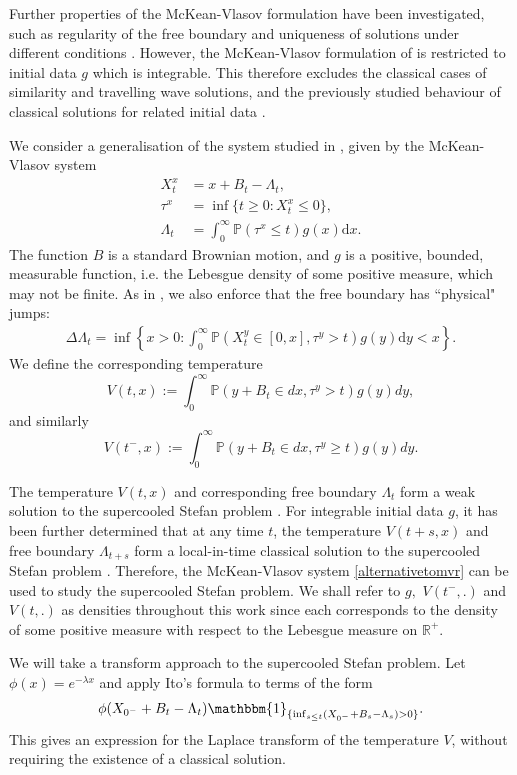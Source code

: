 \documentclass[11pt]{article}
\theoremstyle{plain}
\theoremstyle{remark}
\theoremstyle{definition}
\numberwithin{equation}{section}
\begin{document}
Further properties of the McKean-Vlasov formulation have been investigated, such as regularity of the free boundary \cite{2,3} and uniqueness of solutions under different conditions \cite{5, mustapha2023wellposednesssupercooledstefanproblem, 3, munoz2026freeboundaryregularitywellposedness}. However, the McKean-Vlasov formulation of \cite{3}  is restricted to initial data $g$ which is integrable. This therefore excludes the classical cases of similarity and travelling wave solutions, and the previously studied behaviour of classical solutions for related initial data \cite{Ricci_Weiqing_1991,4}.


We consider a generalisation of the system studied in \cite{3}, given by the McKean-Vlasov system
\begin{align}
    X^x_t &=x+B_t-\Lambda_t,\nonumber\\
    \tau^x &=\inf\{t\geq 0:X^x_t\leq 0\},\label{alternativetomvr}\\
    \Lambda_t &=\int_0^\infty \mathbb{P}(\tau^x\leq t)g(x)\textrm{d}x.\nonumber
\end{align}
The function $B$ is a standard Brownian motion, and $g$ is a positive, bounded, measurable function, i.e. the Lebesgue density of some positive measure, which may not be finite. 
As in \cite{4}, we also enforce that the free boundary has ``physical" jumps:
\begin{align}
\label{alternativephysical}
 \Delta \Lambda_t=\inf\left\{x>0:\int_0^\infty\mathbb{P}(X_t^y\in[0,x],\tau^y>t)g(y)\textrm{d}y<x\right\}.
\end{align}
We define the corresponding temperature
$$V(t,x):=\int_0^\infty \mathbb{P}(y+B_t\in dx,\tau^y>t)g(y)dy,$$
and similarly 
$$V(t^-,x):=\int_0^\infty \mathbb{P}(y+B_{t}\in dx,\tau^y\geq t)g(y)dy.$$ 

The temperature $V(t,x)$ and corresponding free boundary $\Lambda_t$ form a weak solution to the supercooled Stefan problem \cite{2}. For integrable initial data $g$, it has been further determined that at any time $t$, the temperature $V(t+s,x)$ and free boundary $\Lambda_{t+s}$ form a local-in-time classical solution to the supercooled Stefan problem \cite[Theorem 1.1]{3}. Therefore, the McKean-Vlasov system \eqref{alternativetomvr} can be used to study the supercooled Stefan problem.
We shall refer to $g,$ $V(t^-,.)$ and $V(t,.)$ as densities throughout this work since each corresponds to the density of some positive measure with respect to the Lebesgue measure on $\mathbb{R}^+$. 

We will take a transform approach to the supercooled Stefan problem. 
Let $\phi(x)=e^{-\lambda x}$ and apply Ito's formula to terms of the form 
\[\phi(X_{0^-}+B_t-\Lambda_t)\mathbbm{1}_{\{\inf_{s\leq t}(X_{0^-}+B_s-\Lambda_s)>0\}}. \] 
This gives an expression for the Laplace transform of the temperature $V$, without requiring the existence of a classical solution. 
\end{document}
